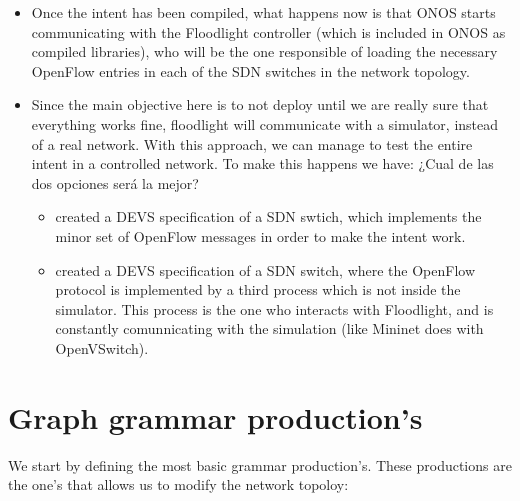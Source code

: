 \documentclass[envcountsect,runningheads]{llncs}
\begin{document}
\begin{itemize}
\item Once the intent has been compiled, what happens now is that ONOS starts communicating with the Floodlight controller (which is included in ONOS as compiled libraries), who will be the one responsible of loading the necessary OpenFlow entries in each of the SDN switches in the network topology.

\item Since the main objective here is to not deploy until we are really sure that everything works fine, floodlight will communicate with a simulator, instead of a real network. With this approach, we can manage to test the entire intent in a controlled network. To make this happens we have: ¿Cual de las dos opciones será la mejor?
	\begin{itemize}
		\item created a DEVS specification of a SDN swtich, which implements the minor set of OpenFlow messages in order to make the intent work.
		\item created a DEVS specification of a SDN switch, where the OpenFlow protocol is implemented by a third process which is not inside the simulator. This process is the one who interacts with Floodlight, and is constantly comunnicating with the simulation (like Mininet does with OpenVSwitch).
	\end{itemize}	 
\end{itemize}



\section{Graph grammar production's}

We start by defining the most basic grammar production's. These 
productions are the one's that allows us to modify the network topoloy:
\end{document}
